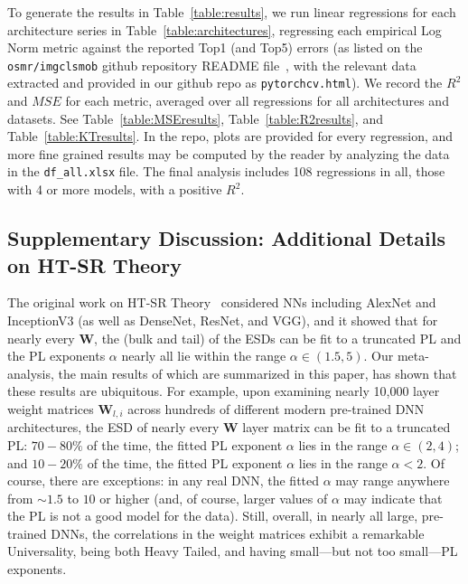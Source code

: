 To generate the results in Table~\ref{table:results}, we run linear regressions for each architecture series in Table~\ref{table:architectures}, regressing each empirical Log Norm metric against the reported Top1 (and Top5) errors (as listed on the \texttt{osmr/imgclsmob} github repository README file~\cite{osmr}, with the relevant data extracted and provided in our github repo as \texttt{pytorchcv.html}).
We record the $R^{2}$ and $MSE$ for each metric, averaged over all regressions for all architectures and datasets.
See Table~\ref{table:MSEresults}, Table~\ref{table:R2results}, and Table~\ref{table:KTresults}.
In the repo, plots are provided for every regression, and more fine grained results may be computed by the reader by analyzing the data in the \texttt{df\_all.xlsx} file.
The final analysis includes 108 regressions in all, those with 4 or more models, with a positive $R^2$.



\subsection{Supplementary Discussion: Additional Details on HT-SR Theory}

The original work on HT-SR Theory~\cite{MM18_TR,MM19_HTSR_ICML,MM20_SDM} considered NNs including AlexNet and InceptionV3 (as well as DenseNet, ResNet, and VGG), and it showed that for nearly every $\mathbf{W}$, the (bulk and tail) of the ESDs can be fit to a truncated PL and the PL exponents $\alpha$ nearly all lie within the range $\alpha\in(1.5,5)$.
Our meta-analysis, the main results of which are summarized in this paper, has shown that these results are ubiquitous.
For example, 
upon examining nearly 10,000 layer weight matrices $\mathbf{W}_{l,i}$ across hundreds of different modern pre-trained DNN architectures, the ESD of nearly every $\mathbf{W}$ layer matrix can be fit to a truncated PL:
$70-80\%$ of the time, the fitted PL exponent $\alpha$ lies in the range $\alpha\in(2,4)$; and  
$10-20\%$ of the time, the fitted PL exponent $\alpha$ lies in the range $\alpha< 2$.  
Of course, there are exceptions: in any real DNN, the fitted $\alpha$ may range anywhere from $\sim 1.5$ to $10$ or higher (and, of course, larger values of $\alpha$ may indicate that the PL is not a good model for the data).  
Still, overall, in nearly all large, pre-trained DNNs, the correlations in the  weight matrices exhibit a remarkable Universality, being both Heavy Tailed, and having small---but not too small---PL exponents. 


